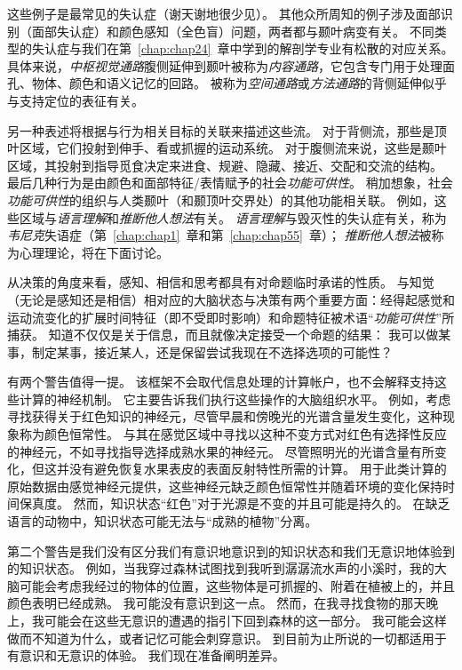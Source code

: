 这些例子是最常见的失认症（谢天谢地很少见）。
其他众所周知的例子涉及面部识别（面部失认症）和颜色感知（全色盲）问题，两者都与颞叶病变有关。
不同类型的失认症与我们在第~\ref{chap:chap24}~章中学到的解剖学专业有松散的对应关系。
具体来说，\textit{中枢视觉通路}腹侧延伸到颞叶被称为\textit{内容通路}，它包含专门用于处理面孔、物体、颜色和语义记忆的回路。
被称为\textit{空间通路}或\textit{方法通路}的背侧延伸似乎与支持定位的表征有关。


另一种表述将根据与行为相关目标的关联来描述这些流。
对于背侧流，那些是顶叶区域，它们投射到伸手、看或抓握的运动系统。
对于腹侧流来说，这些是颞叶区域，其投射到指导觅食决定来进食、规避、隐藏、接近、交配和交流的结构。
最后几种行为是由颜色和面部特征/表情赋予的社会\textit{功能可供性}。
稍加想象，社会\textit{功能可供性}的组织与人类颞叶（和颞顶叶交界处）的其他功能相关联。
例如，这些区域与\textit{语言理解}和\textit{推断他人想法}有关。
\textit{语言理解}与毁灭性的失认症有关，称为\textit{韦尼克}失语症（第~\ref{chap:chap1}~章和第~\ref{chap:chap55}~章）；
\textit{推断他人想法}被称为心理理论，将在下面讨论。


从决策的角度来看，感知、相信和思考都具有对命题临时承诺的性质。
与知觉（无论是感知还是相信）相对应的大脑状态与决策有两个重要方面：经得起感觉和运动流变化的扩展时间特征（即不受即时影响）和命题特征被术语“\textit{功能可供性}”所捕获。
知道不仅仅是关于信息，而且就像决定接受一个命题的结果：
我可以做某事，制定某事，接近某人，还是保留尝试我现在不选择选项的可能性？


有两个警告值得一提。
该框架不会取代信息处理的计算帐户，也不会解释支持这些计算的神经机制。
它主要告诉我们执行这些操作的大脑组织水平。
例如，考虑寻找获得关于红色知识的神经元，尽管早晨和傍晚光的光谱含量发生变化，这种现象称为颜色恒常性。
与其在感觉区域中寻找以这种不变方式对红色有选择性反应的神经元，不如寻找指导选择成熟水果的神经元。
尽管照明光的光谱含量有所变化，但这并没有避免恢复水果表皮的表面反射特性所需的计算。
用于此类计算的原始数据由感觉神经元提供，这些神经元缺乏颜色恒常性并随着环境的变化保持时间保真度。
然而，知识状态“红色”对于光源是不变的并且可能是持久的。
在缺乏语言的动物中，知识状态可能无法与“成熟的植物”分离。


第二个警告是我们没有区分我们有意识地意识到的知识状态和我们无意识地体验到的知识状态。
例如，当我穿过森林试图找到我听到潺潺流水声的小溪时，我的大脑可能会考虑我经过的物体的位置，这些物体是可抓握的、附着在植被上的，并且颜色表明已经成熟。
我可能没有意识到这一点。
然而，在我寻找食物的那天晚上，我可能会在这些无意识的遭遇的指引下回到森林的这一部分。
我可能会这样做而不知道为什么，或者记忆可能会刺穿意识。
到目前为止所说的一切都适用于有意识和无意识的体验。
我们现在准备阐明差异。



